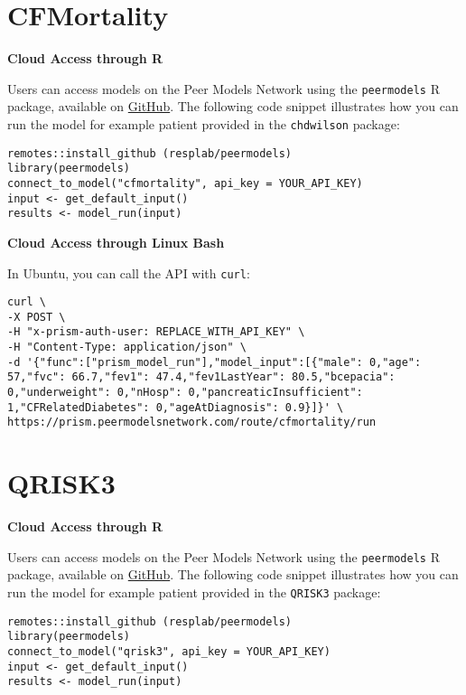 \documentclass[
]{book}
\begin{document}
\hypertarget{cfmortality}{%
\section{CFMortality}\label{cfmortality}}

\textbf{Cloud Access through R}

Users can access models on the Peer Models Network using the \texttt{peermodels} R package, available on \href{https://github.com/resplab/peermodels}{GitHub}. The following code snippet illustrates how you can run the model for example patient provided in the \texttt{chdwilson} package:

\begin{verbatim}
remotes::install_github (resplab/peermodels)
library(peermodels)
connect_to_model("cfmortality", api_key = YOUR_API_KEY)
input <- get_default_input()
results <- model_run(input)
\end{verbatim}

\textbf{Cloud Access through Linux Bash}

In Ubuntu, you can call the API with \texttt{curl}:

\begin{verbatim}
curl \
-X POST \
-H "x-prism-auth-user: REPLACE_WITH_API_KEY" \
-H "Content-Type: application/json" \
-d '{"func":["prism_model_run"],"model_input":[{"male": 0,"age": 57,"fvc": 66.7,"fev1": 47.4,"fev1LastYear": 80.5,"bcepacia": 0,"underweight": 0,"nHosp": 0,"pancreaticInsufficient": 1,"CFRelatedDiabetes": 0,"ageAtDiagnosis": 0.9}]}' \
https://prism.peermodelsnetwork.com/route/cfmortality/run
\end{verbatim}

\hypertarget{qrisk3}{%
\section{QRISK3}\label{qrisk3}}

\textbf{Cloud Access through R}

Users can access models on the Peer Models Network using the \texttt{peermodels} R package, available on \href{https://github.com/resplab/peermodels}{GitHub}. The following code snippet illustrates how you can run the model for example patient provided in the \texttt{QRISK3} package:

\begin{verbatim}
remotes::install_github (resplab/peermodels)
library(peermodels)
connect_to_model("qrisk3", api_key = YOUR_API_KEY)
input <- get_default_input()
results <- model_run(input)
\end{verbatim}
\end{document}
